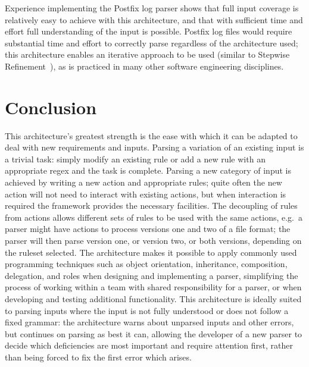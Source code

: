 \documentclass{svmult}
\begin{document}
Experience implementing the Postfix log parser shows that full input
coverage is relatively easy to achieve with this architecture, and that
with sufficient time and effort full understanding of the input is
possible.  Postfix log files would require substantial time and effort to
correctly parse regardless of the architecture used; this architecture
enables an iterative approach to be used (similar to Stepwise
Refinement~\cite{stepwise-refinement}), as is practiced in many other
software engineering disciplines.

\section{Conclusion}

This architecture's greatest strength is the ease with which it can be
adapted to deal with new requirements and inputs.  Parsing a variation of
an existing input is a trivial task: simply modify an existing rule or add
a new rule with an appropriate regex and the task is complete.  Parsing a
new category of input is achieved by writing a new action and appropriate
rules; quite often the new action will not need to interact with existing
actions, but when interaction is required the framework provides the
necessary facilities.  The decoupling of rules from actions allows
different sets of rules to be used with the same actions, e.g.\ a parser
might have actions to process versions one and two of a file format; the
parser will then parse version one, or version two, or both versions,
depending on the ruleset selected.  The architecture makes it possible to
apply commonly used programming techniques such as object orientation,
inheritance, composition, delegation, and roles when designing and
implementing a parser, simplifying the process of working within a team
with shared responsibility for a parser, or when developing and testing
additional functionality.  This architecture is ideally suited to parsing
inputs where the input is not fully understood or does not follow a fixed
grammar: the architecture warns about unparsed inputs and other errors, but
continues on parsing as best it can, allowing the developer of a new parser
to decide which deficiencies are most important and require attention
first, rather than being forced to fix the first error which arises.
\end{document}
